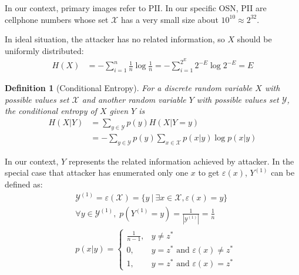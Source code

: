 \documentclass[10pt, conference, compsocconf]{IEEEtran}
\newtheorem{mydef}{Definition}
\begin{document}
 		In our context, primary images refer to PII.
 		In our specific OSN, PII are cellphone numbers
		whose set $\mathcal X$ has a very small
        size about $10^{10} \approx 2^{32}$.

        In ideal situation, the attacker has no related information, so $X$ should
        be uniformly distributed:
        \begin{align*}
            H(X) &= -\sum_{i=1}^{n} \frac{1}{n} \log \frac{1}{n}
            	= -\sum_{i=1}^{2^E} 2^{-E} \log 2^{-E}
                = E
        \end{align*}

        \begin{mydef}[Conditional Entropy\cite{math_book, info_measure}]\label{def_con_entropy}
            For a discrete random variable $X$ with
            possible values set $\mathcal X$ and another random
            variable $Y$ with possible values
            set $\mathcal{Y}$, the conditional entropy
            of $X$ given $Y$ is
            \begin{align}
                H(X|Y) &= \sum_{y \in \mathcal Y} p(y) H(X | Y = y)\\
                    &= -\sum_{y \in \mathcal Y} p(y) \sum_{x \in \mathcal X} p(x|y) \log p(x|y)
            \end{align}
        \end{mydef}

        In our context, $Y$ represents the related information
        achieved by attacker. In the special case that attacker has enumerated only one
        $x$ to get $\varepsilon(x)$, $Y^{(1)}$ can be defined as:
        \begin{align*}
            &\mathcal Y^{(1)} = \varepsilon(\mathcal X) = \{y \: | \: \exists x \in \mathcal X, \varepsilon(x) = y\}\\
            &\forall y \in \mathcal Y^{(1)}, \; p(Y^{(1)} = y) = \frac{1}{|\mathcal Y^{(1)}|} = \frac{1}{n}\\
            &p(x|y) = \begin{cases}
                \frac{1}{n-1}, &y \neq z^*\\
                0, &y = z^* \text{ and } \varepsilon(x) \neq z^*\\
                1, &y = z^* \text{ and } \varepsilon(x) = z^*
            \end{cases}
        \end{align*}
\end{document}

